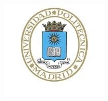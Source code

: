 \documentclass[
11pt, %
spanish, %
onehalfspacing, %
]{MastersDoctoralThesis_custom} %
\author{Francisco Javier \textsc{García Algarra}} %
\begin{document}
\frontmatter %

\pagestyle{plain} %


\begin{titlepage}
\begin{center}
\includegraphics[scale=0.6]{Figures/logoupm.jpg}

\textsc{\large \groupname}\\
\textsc{\large \deptname}\\[5.5cm] %



{\huge \textsc \ttitle}\\[5cm] %
 
 

\end{center}
\end{titlepage}
\end{document}
